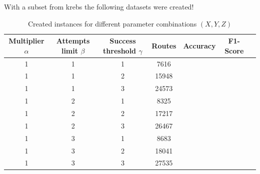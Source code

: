 With a subset from krebs the following datasets were created!
\begin{table}[h!]
    \centering
    \begin{tabular}{c c cc c c c}
        \hline
        Multiplier $\alpha$ & Attempts limit $\beta$ & Success threshold $\gamma$ & Routes & Accuracy & F1-Score \\
        \hline
        1                   & 1                      & 1                          & 7616   &          &          \\
        1                   & 1                      & 2                          & 15948  &          &          \\
        1                   & 1                      & 3                          & 24573  &          &          \\
        1                   & 2                      & 1                          & 8325   &          &          \\
        1                   & 2                      & 2                          & 17217  &          &          \\
        1                   & 2                      & 3                          & 26467  &          &          \\
        1                   & 3                      & 1                          & 8683   &          &          \\
        1                   & 3                      & 2                          & 18041  &          &          \\
        1                   & 3                      & 3                          & 27535  &          &          \\
        \hline
    \end{tabular}
    \caption{Created instances for different parameter combinations $(X, Y, Z)$}
    \label{tab:created_instances_xyz}
\end{table}

